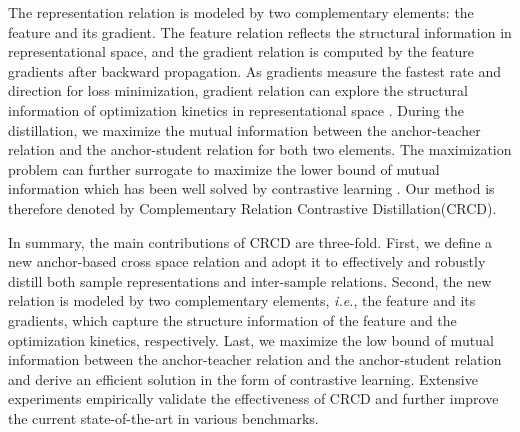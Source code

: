 \documentclass[final]{cvpr}
\begin{document}
The representation relation is modeled by two complementary elements: the feature and its gradient. The feature relation reflects the structural information in representational space, and the gradient relation is computed by the feature gradients after backward propagation. As gradients measure the fastest rate and direction for loss minimization, gradient relation can explore the structural information of optimization kinetics in representational space \cite{ab,LayerwiseCTL}. During the distillation, we maximize the mutual information between the anchor-teacher relation and the anchor-student relation for both two elements. The maximization problem can further surrogate to maximize the lower bound of mutual information which has been well solved by contrastive learning \cite{wu2018unsupervised}. Our method is therefore denoted by Complementary Relation Contrastive Distillation(CRCD). 

In summary, the main contributions of CRCD are three-fold. First, we define a new  anchor-based cross space relation and adopt it to effectively and robustly distill both sample representations and inter-sample relations. Second, the new relation is modeled by two complementary elements, \emph{i.e.}, the feature and its gradients, which capture the structure information of the feature and the optimization kinetics, respectively. Last, we maximize the low bound of mutual information between the anchor-teacher relation and the anchor-student relation and derive an efficient solution in the form of contrastive learning.  Extensive experiments empirically validate the effectiveness of CRCD and further improve the current state-of-the-art in various benchmarks.







































 
\end{document}
